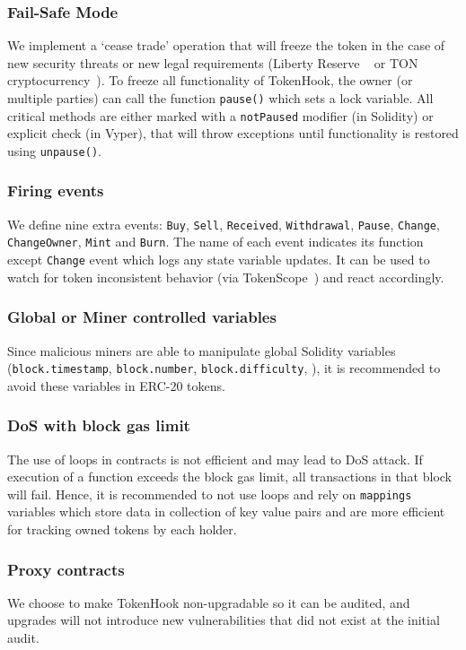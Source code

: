 \subsubsection{Fail-Safe Mode} We implement a `cease trade' operation that will freeze the token in the case of new security threats or new legal requirements (\eg Liberty Reserve ~\cite{LibertyReserve} or TON cryptocurrency~\cite{TON}). To freeze all functionality of TokenHook, the owner (or multiple parties) can call the function \texttt{pause()} which sets a lock variable. All critical methods are either marked with a \texttt{notPaused} modifier (in Solidity) or explicit check (in Vyper), that will throw exceptions until functionality is restored using \texttt{unpause()}. 

\subsubsection{Firing events} We define nine extra events: \texttt{Buy}, \texttt{Sell}, \texttt{Received}, \texttt{Withdrawal}, \texttt{Pause}, \texttt{Change}, \texttt{ChangeOwner}, \texttt{Mint} and \texttt{Burn}. The name of each event indicates its function except \texttt{Change} event which logs any state variable updates. It can be used to watch for token inconsistent behavior (\eg via TokenScope~\cite{TokenScope}) and react accordingly. 

\subsubsection{Global or Miner controlled variables}
Since malicious miners are able to manipulate global Solidity variables (\eg \texttt{block.timestamp}, \texttt{block.number}, \texttt{block.difficulty}, \etc), it is recommended to avoid these variables in ERC-20 tokens.

\subsubsection{DoS with block gas limit}
The use of loops in contracts is not efficient and may lead to DoS attack. If execution of a function exceeds the block gas limit, all transactions in that block will fail. Hence, it is recommended to not use loops and rely on \texttt{mappings} variables which store data in collection of key value pairs and are more efficient for tracking owned tokens by each holder.

\subsubsection{Proxy contracts} We choose to make TokenHook non-upgradable so it can be audited, and upgrades will not introduce new vulnerabilities that did not exist at the initial audit. 

